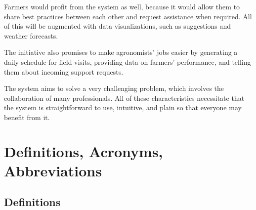 Farmers would profit from the system as well, because it would allow them to share best practices between each other and request assistance when required. All of this will be augmented with data visualizations, such as suggestions and weather forecasts.

The initiative also promises to make agronomists' jobs easier by generating a daily schedule for field visits, providing data on farmers' performance, and telling them about incoming support requests.

The system aims to solve a very challenging problem, which involves the collaboration of many professionals. All of these characteristics necessitate that the system is straightforward to use, intuitive, and plain so that everyone may benefit from it.

\section{Definitions, Acronyms, Abbreviations}

\subsection{Definitions}

